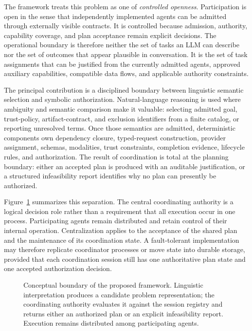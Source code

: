 The framework treats this problem as one of \emph{controlled openness}. Participation is open in the sense that independently implemented agents can be admitted through externally visible contracts. It is controlled because admission, authority, capability coverage, and plan acceptance remain explicit decisions. The operational boundary is therefore neither the set of tasks an LLM can describe nor the set of outcomes that appear plausible in conversation. It is the set of task assignments that can be justified from the currently admitted agents, approved auxiliary capabilities, compatible data flows, and applicable authority constraints.

The principal contribution is a disciplined boundary between linguistic semantic selection and symbolic authorization. Natural-language reasoning is used where ambiguity and semantic comparison make it valuable: selecting admitted goal, trust-policy, artifact-contract, and exclusion identifiers from a finite catalog, or reporting unresolved terms. Once those semantics are admitted, deterministic components own dependency closure, typed-request construction, provider assignment, schemas, modalities, trust constraints, completion evidence, lifecycle rules, and authorization. The result of coordination is total at the planning boundary: either an accepted plan is produced with an auditable justification, or a structured infeasibility report identifies why no plan can presently be authorized.

Figure~\ref{fig:process-overview} summarizes this separation. The central coordinating authority is a logical decision role rather than a requirement that all execution occur in one process. Participating agents remain distributed and retain control of their internal operation. Centralization applies to the acceptance of the shared plan and the maintenance of its coordination state. A fault-tolerant implementation may therefore replicate coordinator processes or move state into durable storage, provided that each coordination session still has one authoritative plan state and one accepted authorization decision.

\begin{figure}[htbp]
\centering
\resizebox{0.96\textwidth}{!}{}
\caption{Conceptual boundary of the proposed framework. Linguistic interpretation produces a candidate problem representation; the coordinating authority evaluates it against the session registry and returns either an authorized plan or an explicit infeasibility report. Execution remains distributed among participating agents.}
\label{fig:process-overview}
\end{figure}

